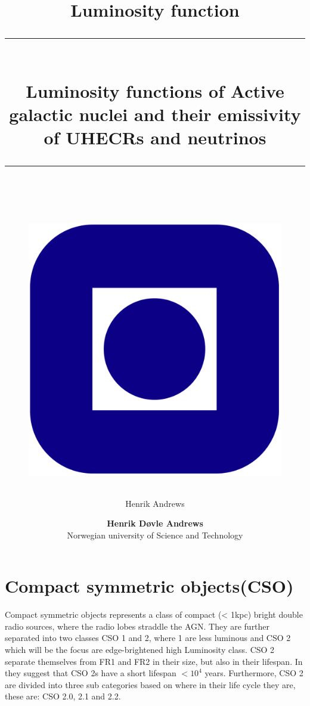 \documentclass[11pt]{article}
\title{Luminosity function}
\author{Henrik Andrews}
\newcommand{\HRule}[1]{\rule{\linewidth}{#1}}
\begin{document}
\title{ \normalsize
	\HRule{0.5pt} \\
	\LARGE \textbf{{Luminosity functions of Active galactic nuclei and their emissivity of UHECRs and neutrinos}}	
	\\
	\HRule{2pt} \\ [0.5cm]		
	\vspace{6cm}
	\begin{figure}[htp]
    \centering
    \includegraphics[width=.2\textwidth]{Logo-Ntnu.svg.png}
    \end{figure}
	}

\author{
    \normalsize 
	\textbf{Henrik Døvle Andrews } \\
	Norwegian university of Science and Technology \\ 
}

\maketitle
\setcounter{page}{ 0 }

\newpage

\pagestyle{fancy}
\fancyhf{}
\setlength\headheight{14pt}
\fancyhead[R]{\leftmark}
\setcounter{page}{1}


\maketitle


\section{Compact symmetric objects(CSO)}

Compact symmetric objects represents a class of compact (< 1kpc) bright double radio sources, where the radio lobes straddle the AGN.
They are further separated into two classes CSO 1 and 2, where 1 are less luminous and CSO 2 which will be the focus are edge-brightened high Luminosity class. 
CSO 2 separate themselves from FR1 and FR2 in their size, but also in their lifespan. In \cite{sullivan2024smallscale} they suggest that CSO 2s have a short lifespan $<10^4$ years.
Furthermore, CSO 2 are divided into three sub categories based on where in their life cycle they are, these are: CSO 2.0, 2.1 and 2.2. 
\end{document}
